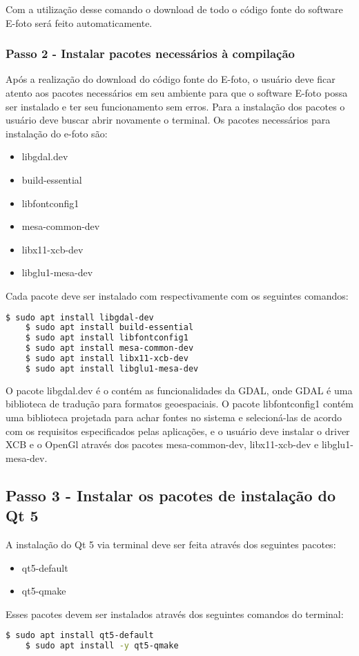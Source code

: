 Com a utilização desse comando o download de todo o código fonte do software E-foto será feito automaticamente.  
    
\subsubsection{Passo 2 - Instalar pacotes necessários à compilação}  
Após a realização do download do código fonte do E-foto, o usuário deve ficar atento aos pacotes necessários em seu ambiente para que o software E-foto possa ser instalado e ter seu funcionamento sem erros. Para a instalação dos pacotes o usuário deve buscar abrir novamente o terminal. Os pacotes necessários para instalação do e-foto são:
\begin{itemize}
   	\item libgdal.dev
   	\item build-essential
   	\item libfontconfig1
   	\item mesa-common-dev
   	\item libx11-xcb-dev
   	\item libglu1-mesa-dev
\end{itemize}
Cada pacote deve ser instalado com respectivamente com os seguintes comandos:	
\begin{lstlisting}[language=bash]
	$ sudo apt install libgdal-dev
	$ sudo apt install build-essential
	$ sudo apt install libfontconfig1
	$ sudo apt install mesa-common-dev
	$ sudo apt install libx11-xcb-dev 
	$ sudo apt install libglu1-mesa-dev
\end{lstlisting}				
	
O pacote libgdal.dev é o contém as funcionalidades da GDAL, onde GDAL é uma biblioteca de tradução para formatos geoespaciais. O pacote libfontconfig1 contém uma biblioteca projetada para achar fontes no sistema e selecioná-las de acordo com os requisitos especificados pelas aplicações, e o usuário deve instalar o driver XCB e o OpenGl através dos pacotes mesa-common-dev, libx11-xcb-dev e libglu1-mesa-dev. 
    
\subsection{Passo 3 - Instalar os pacotes de instalação do Qt 5}   
A instalação do Qt 5 via terminal deve ser feita através dos seguintes pacotes:
\begin{itemize}
	\item qt5-default
	\item qt5-qmake
\end{itemize}   
Esses pacotes devem ser instalados através dos seguintes comandos do terminal:
\begin{lstlisting}[language=bash]
	$ sudo apt install qt5-default
    $ sudo apt install -y qt5-qmake
\end{lstlisting}	
    
